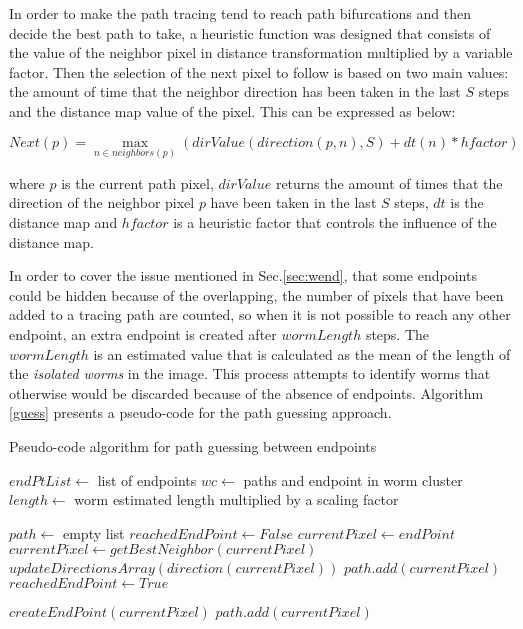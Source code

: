 In order to make the path tracing tend to reach path bifurcations and then decide the best
path to take, a heuristic function was designed that consists of the value of the neighbor pixel
in distance transformation multiplied by a variable factor.
Then the selection of the next pixel to follow is based on two main values:
the amount of time that the neighbor direction has been taken in the last $S$ steps and
the distance map value of the pixel. This can be expressed as below:

$$Next(p) = \max_{n \in neighbors(p)} (dirValue(direction(p,n),S) + dt(n)*hfactor)$$

where $p$ is the current path pixel, $dirValue$ returns the amount of times that the 
direction of the neighbor pixel $p$ have been taken in the last $S$ steps, $dt$ is the 
distance map and $hfactor$ is a heuristic factor that controls the influence of the
distance map.

In order to cover the issue mentioned in Sec.\ref{sec:wend}, that some endpoints could
be hidden because of the overlapping, the number of pixels that have been added
to a tracing path are counted, so when it is not possible to reach any other endpoint,
an extra endpoint is created after $wormLength$ steps. 
The $wormLength$ is an estimated value that is calculated
as the mean of the length of the \emph{isolated worms} in the image. This process
attempts to identify worms that otherwise would be discarded because of the absence
of endpoints. Algorithm \ref{guess} presents a pseudo-code for the path
guessing approach.

\begin{algorithm}                     
\caption{Pseudo-code algorithm for path guessing between endpoints}         
\label{guess}                    
\begin{algorithmic}                   

\STATE $endPtList \leftarrow$ list of endpoints
\STATE $wc \leftarrow$ paths and endpoint in worm cluster 
\STATE $length \leftarrow$ worm estimated length multiplied by a scaling factor
\STATE {}
\ENDIF
{}

\STATE $path \leftarrow$ empty list
\STATE $reachedEndPoint \leftarrow False$
\STATE $currentPixel \leftarrow endPoint$
\STATE $currentPixel \leftarrow getBestNeighbor(currentPixel)$
\STATE $updateDirectionsArray(direction(currentPixel))$
\STATE $path.add(currentPixel)$
\STATE $reachedEndPoint \leftarrow True$
\ENDIF
\ENDWHILE 

\STATE $createEndPoint(currentPixel)$
\STATE $path.add(currentPixel)$
\ELSE
\STATE {}
\ENDIF
\ENDIF
\ENDFOR

\end{algorithmic}
\end{algorithm}

